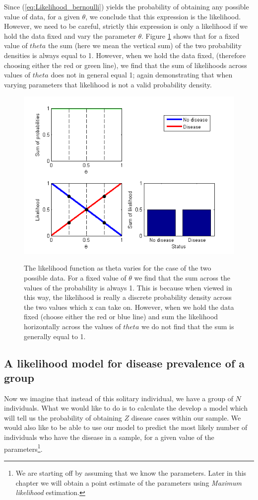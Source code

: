 \documentclass[11pt,fullpage]{book}
\begin{document}
Since (\ref{eq:Likelihood_bernoulli}) yields the probability of obtaining any possible value of data, for a given $\theta$, we conclude that this expression is the likelihood. However, we need to be careful, strictly this expression is only a likelihood if we hold the data fixed and vary the parameter $\theta$. Figure \ref{fig:Likelihood_bernoulli} shows that for a fixed value of $theta$ the sum (here we mean the vertical sum) of the two probability densities is always equal to 1. However, when we hold the data fixed, (therefore choosing either the red or green line), we find that the sum of likelihoods across values of $theta$ does not in general equal 1; again demonstrating that when varying parameters that likelihood is not a valid probability density.

\begin{figure}
\centering
\scalebox{0.75} 
{\includegraphics{likelihood_bernoulli.png}}
\caption{The likelihood function as theta varies for the case of the two possible data. For a fixed value of $\theta$ we find that the sum across the values of the probability is always 1. This is because when viewed in this way, the likelihood is really a discrete probability density across the two values which x can take on. However, when we hold the data fixed (choose either the red or blue line) and sum the likelihood horizontally across the values of $theta$ we do not find that the sum is generally equal to 1. }\label{fig:Likelihood_bernoulli}
\end{figure}

\subsection{A likelihood model for disease prevalence of a group}
Now we imagine that instead of this solitary individual, we have a group of $N$ individuals. What we would like to do is to calculate the develop a model which will tell us the probability of obtaining $Z$ disease cases within our sample. We would also like to be able to use our model to predict the most likely number of individuals who have the disease in a sample, for a given value of the parameters\footnote{We are starting off by assuming that we know the parameters. Later in this chapter we will obtain a point estimate of the parameters using \textit{Maximum likelihood} estimation.}. 
\end{document}
